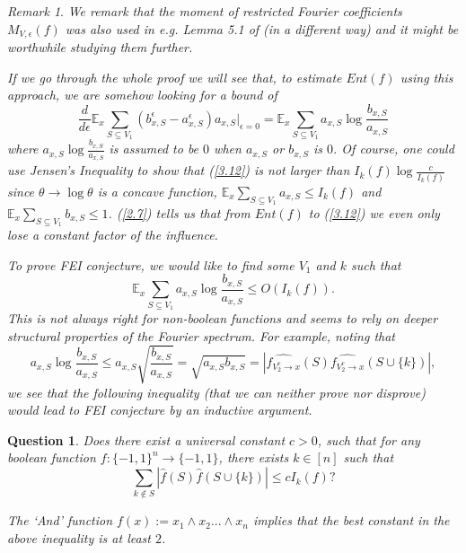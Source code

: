 \documentclass[10pt]{article} \usepackage[utf8]{inputenc}
\newtheorem{quest}{Question}[section]
\theoremstyle{definition}
\theoremstyle{remark}
\newtheorem{rem}{Remark}[section]
\numberwithin{equation}{section}
\begin{document}
\begin{rem}
\emph{We remark that the moment of restricted Fourier coefficients $M_{V,\epsilon}(f)$ was also used in e.g. Lemma 5.1 of \cite{1} (in a different way) and it might be worthwhile studying them further.}

\emph{If we go through the whole proof we will see that, to estimate $Ent(f)$ using this approach, we are somehow looking for a bound of
\begin{equation}
\label{3.12}
\frac{d}{d\epsilon}\mathbb{E}_x\sum_{S\subseteq V_1}(b_{x,S}^\epsilon-a_{x,S}^\epsilon)a_{x,S}\big|_{\epsilon=0}=\mathbb{E}_x\sum_{S\subseteq V_1}a_{x,S}\log\frac{b_{x,S}}{a_{x,S}}
\end{equation}
where $a_{x,S}\log\frac{b_{x,S}}{a_{x,S}}$ is assumed to be $0$ when $a_{x,S}$ or $b_{x,S}$ is $0$. Of course, one could use Jensen's Inequality to show that (\ref{3.12}) is not larger than $I_k(f)\log\frac{c}{I_k(f)}$ since $\theta \to \log \theta$ is a concave function, $\mathbb{E}_x\sum\limits_{S\subseteq V_1}a_{x, S}\leq I_k(f)$ and $\mathbb{E}_x\sum\limits_{S\subseteq V_1}b_{x, S}\leq 1$. (\ref{2.7}) tells us that from $Ent(f)$ to (\ref{3.12}) we even only lose a constant factor of the influence.}

\emph{To prove FEI conjecture, we would like to find some $V_1$ and $k$ such that 
\begin{equation}
\mathbb{E}_x\sum_{S\subseteq V_1}a_{x,S}\log\frac{b_{x,S}}{a_{x,S}}\leq O(I_k(f)).
\end{equation} 
This is not always right for non-boolean functions and seems to rely on deeper structural properties of the Fourier spectrum. For example, noting that $$a_{x, S}\log\frac{b_{x, S}}{a_{x, S}}\leq a_{x, S}\sqrt{\frac{b_{x, S}}{a_{x, S}}}=\sqrt{a_{x, S}b_{x, S}}=|\widehat{f_{V_2^{c} \to x}}(S)\widehat{f_{V_2^{c} \to x}}(S\cup \{k\})|,$$ we see that the following inequality (that we can neither prove nor disprove) would lead to FEI conjecture by an inductive argument.}
\begin{quest}
\label{C31}
Does there exist a universal constant $c>0$, such that for any boolean function $f:\{-1,1\}^n \to \{-1,1\}$, there exists $k\in [n]$ such that
\begin{equation}
\sum_{k\notin S} |\hat{f}(S)\hat{f}(S\cup \{k\})| \leq c I_k(f)?
\end{equation}
\end{quest}
\emph{
The `And' function $f(x):=x_1 \wedge x_2 ... \wedge x_n$ implies that the best constant in the above inequality is at least $2$.}
\end{rem}
\end{document}
